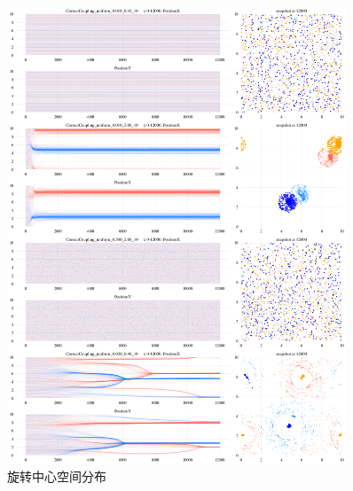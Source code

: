 \documentclass{article}
\begin{document}
\begin{figure}[H]
	\centering
	\includegraphics[width=0.9\textwidth]{./figs/totalXY.png}
	\caption{旋转中心空间分布}
	\label{fig:fig234t.1}
\end{figure}





\end{document}
